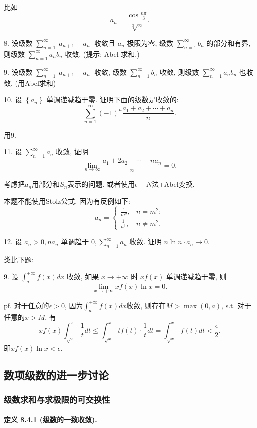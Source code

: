 比如
\[
a_{n}=\frac{\cos\frac{n\pi}{3}}{\sqrt[3]{n}}.
\]

8. 设级数 $\sum_{n=1}^{\infty}\left|a_{n+1}-a_{n}\right|$ 收敛且 $a_{n}$
极限为零, 级数 $\sum_{n=1}^{\infty}b_{n}$ 的部分和有界, 则级数 $\sum_{n=1}^{\infty}a_{n}b_{n}$
收敛. (提示: Abel 求和.)

9. 设级数 $\sum_{n=1}^{\infty}\left|a_{n+1}-a_{n}\right|$ 收敛, 级数 $\sum_{n=1}^{\infty}b_{n}$
收敛, 则级数 $\sum_{n=1}^{\infty}a_{n}b_{n}$ 也收敛. (用Abel求和)

10. 设 $\left\{ a_{n}\right\} $ 单调递减趋于零. 证明下面的级数是收敛的: 
\[
\sum_{n=1}^{\infty}(-1)^{n}\frac{a_{1}+a_{2}+\cdots+a_{n}}{n}.
\]

用9.

11. 设 $\sum_{n=1}^{\infty}a_{n}$ 收敛, 证明 
\[
\lim_{n\rightarrow\infty}\frac{a_{1}+2a_{2}+\cdots+na_{n}}{n}=0.
\]

考虑把$a_{n}$用部分和$S_{n}$表示的问题. 或者使用$\epsilon-N$法+Abel变换.

本题不能使用Stolz公式, 因为有反例如下:
\[
a_{n}=\begin{cases}
\frac{1}{m^{2}}, & n=m^{2};\\
\frac{1}{n^{3}}, & n\ne m^{2}.
\end{cases}
\]

12. 设 $a_{n}>0,na_{n}$ 单调趋于 $0,\sum_{n=1}^{\infty}a_{n}$ 收敛. 证明
$n\ln n\cdot a_{n}\rightarrow0$.

类比下题:

9. 设 $\int_{a}^{+\infty}f(x)dx$ 收敛, 如果 $x\rightarrow+\infty$ 时 $xf(x)$
单调递减趋于零, 则 
\[
\lim_{x\rightarrow+\infty}xf(x)\ln x=0.
\]

pf. 对于任意的$\epsilon>0$, 因为$\int_{a}^{+\infty}f(x)dx$收敛, 则存在$M>\max(0,a)$,
s.t. 对于任意的$x>M$, 有
\[
xf(x)\int_{\sqrt{x}}^{x}\frac{1}{t}dt\le\int_{\sqrt{x}}^{x}tf(t)\cdot\frac{1}{t}dt=\int_{\sqrt{x}}^{x}f(t)dt<\frac{\epsilon}{2}.
\]
即$xf(x)\ln x<\epsilon$.

\subsection{数项级数的进一步讨论}

\subsubsection{级数求和与求极限的可交换性}

\paragraph{定义 8.4.1 (级数的一致收敛). }

